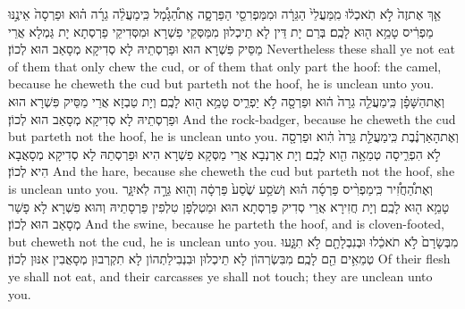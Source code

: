 {אַ֤ךְ אֶת\maqqaf זֶה֙ לֹ֣א תֹֽאכְל֔וּ מִֽמַּעֲלֵי֙ הַגֵּרָ֔ה וּמִמַּפְרִסֵ֖י הַפַּרְסָ֑ה אֶֽת\maqqaf הַ֠גָּמָ֠ל כִּֽי\maqqaf מַעֲלֵ֨ה גֵרָ֜ה ה֗וּא וּפַרְסָה֙ אֵינֶ֣נּוּ מַפְרִ֔יס טָמֵ֥א ה֖וּא לָכֶֽם׃}
{בְּרַם יָת דֵּין לָא תֵיכְלוּן מִמַּסְּקֵי פִשְׁרָא וּמִסְּדִיקֵי פַרְסְתָא יָת גַּמְלָא אֲרֵי מַסֵּיק פִּשְׁרָא הוּא וּפַרְסְתֵיהּ לָא סְדִיקָא מְסָאַב הוּא לְכוֹן׃}
{Nevertheless these shall ye not eat of them that only chew the cud, or of them that only part the hoof: the camel, because he cheweth the cud but parteth not the hoof, he is unclean unto you.}{}
{וְאֶת\maqqaf הַשָּׁפָ֗ן כִּֽי\maqqaf מַעֲלֵ֤ה גֵרָה֙ ה֔וּא וּפַרְסָ֖ה לֹ֣א יַפְרִ֑יס טָמֵ֥א ה֖וּא לָכֶֽם׃}
{וְיָת טַבְזָא אֲרֵי מַסֵּיק פִּשְׁרָא הוּא וּפַרְסְתֵיהּ לָא סְדִיקָא מְסָאַב הוּא לְכוֹן׃}
{And the rock-badger, because he cheweth the cud but parteth not the hoof, he is unclean unto you.}{}
{וְאֶת\maqqaf הָאַרְנֶ֗בֶת כִּֽי\maqqaf מַעֲלַ֤ת גֵּרָה֙ הִ֔וא וּפַרְסָ֖ה לֹ֣א הִפְרִ֑יסָה טְמֵאָ֥ה הִ֖וא לָכֶֽם׃}
{וְיָת אַרְנְבָא אֲרֵי מַסְּקָא פִשְׁרָא הִיא וּפַרְסְתַהּ לָא סְדִיקָא מְסָאֲבָא הִיא לְכוֹן׃}
{And the hare, because she cheweth the cud but parteth not the hoof, she is unclean unto you.}{}
{וְאֶת\maqqaf הַ֠חֲזִ֠יר כִּֽי\maqqaf מַפְרִ֨יס פַּרְסָ֜ה ה֗וּא וְשֹׁסַ֥ע שֶׁ֙סַע֙ פַּרְסָ֔ה וְה֖וּא גֵּרָ֣ה לֹֽא\maqqaf יִגָּ֑ר טָמֵ֥א ה֖וּא לָכֶֽם׃}
{וְיָת חֲזִירָא אֲרֵי סְדִיק פַּרְסְתָא הוּא וּמַטְלְפָן טִלְפִין פַּרְסָתֵיהּ וְהוּא פִשְׁרָא לָא פָשַׁר מְסָאַב הוּא לְכוֹן׃}
{And the swine, because he parteth the hoof, and is cloven-footed, but cheweth not the cud, he is unclean unto you.}{}
{מִבְּשָׂרָם֙ לֹ֣א תֹאכֵ֔לוּ וּבְנִבְלָתָ֖ם לֹ֣א תִגָּ֑עוּ טְמֵאִ֥ים הֵ֖ם לָכֶֽם׃}
{מִבִּשְׂרְהוֹן לָא תֵיכְלוּן וּבִנְבִילַתְהוֹן לָא תִקְרְבוּן מְסָאֲבִין אִנּוּן לְכוֹן׃}
{Of their flesh ye shall not eat, and their carcasses ye shall not touch; they are unclean unto you.}{}
